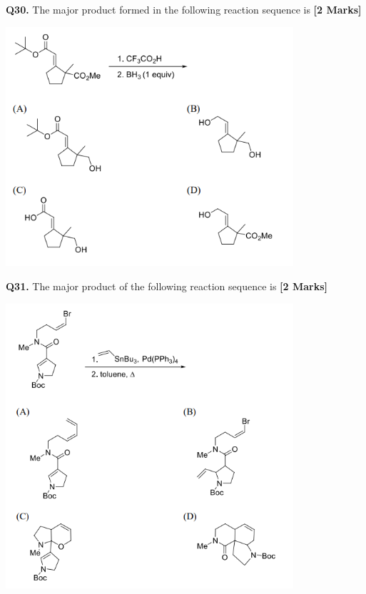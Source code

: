 \documentclass[11pt]{article}
\newcommand{\questionb}[2]{
    \noindent\textbf{Q#2.} #1 \hfill \textbf{[2 Marks]}
}
\begin{document}
\vspace{0.5cm}

\questionb{The major product formed in the following reaction sequence is}{30}
\begin{center}
\includegraphics[width=0.8\textwidth]{figures/30.png}
\end{center}

\vspace{0.5cm}

\questionb{The major product of the following reaction sequence is}{31}
\begin{center}
\includegraphics[width=0.8\textwidth]{figures/31.png}
\end{center}

\vspace{0.5cm}
\end{document}
